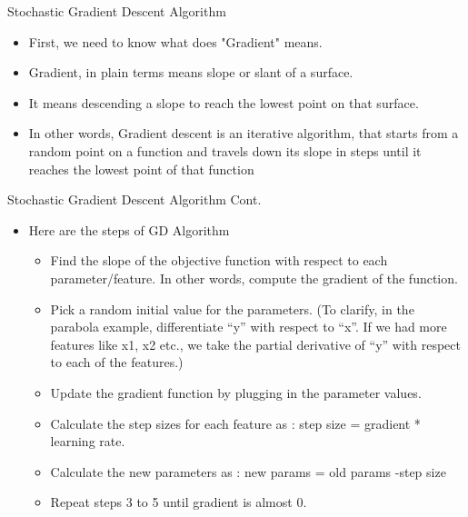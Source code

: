 		
		
	



\begin{frame}{Stochastic Gradient Descent Algorithm}
    \begin{itemize}
        \item First, we need to know what does "Gradient" means.
        \item Gradient, in plain terms means slope or slant of a surface.
        \item It means descending a slope to reach the lowest point on that surface.
        \item In other words, Gradient descent is an iterative algorithm, that starts from a random point on a function and travels down its slope in steps until it reaches the lowest point of that function
    \end{itemize}
\end{frame}

\begin{frame}{Stochastic Gradient Descent Algorithm Cont.}
    \begin{itemize}
        \item Here are the steps of GD Algorithm
        \begin{itemize}
            \item Find the slope of the objective function with respect to each parameter/feature. In other words, compute the gradient of the function.
            \item Pick a random initial value for the parameters. (To clarify, in the parabola example, differentiate “y” with respect to “x”. If we had more features like x1, x2 etc., we take the partial derivative of “y” with respect to each of the features.)
            \item Update the gradient function by plugging in the parameter values.
            \item Calculate the step sizes for each feature as : step size = gradient * learning rate.
            \item Calculate the new parameters as : new params = old params -step size
            \item Repeat steps 3 to 5 until gradient is almost 0.
        \end{itemize}
    \end{itemize}
\end{frame}

